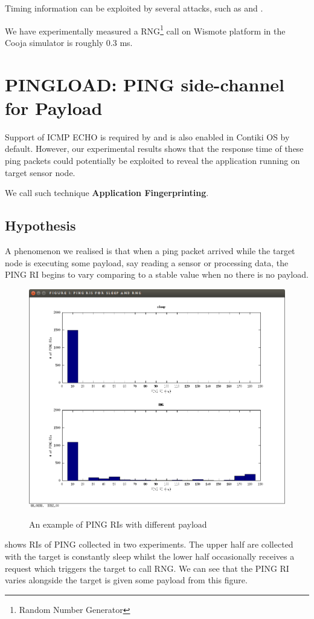 Timing information can be exploited by several attacks, such as \cite{Peekaboo} and \cite{rsatiming}.

We have experimentally measured a RNG\footnote{Random Number Generator} call on Wismote platform in the Cooja simulator is roughly 0.3 ms.

\section{PINGLOAD: PING side-channel for Payload }
Support of ICMP ECHO is required by \cite{rfc1122} and is also enabled in Contiki OS by default. However, our experimental results shows that the response time of these ping packets could potentially be exploited to reveal the application running on target sensor node.

We call such technique {\bf  Application Fingerprinting}.

\subsection{Hypothesis}
A phenomenon we realised is that when a ping packet arrived while the target node is executing some payload, say reading a sensor or processing data, the PING RI begins to vary comparing to a stable value  when no there is no payload. 

\begin{example}
\begin{figure}
\centering
{
  \includegraphics[width=1\textwidth]{fig/pingri.png}
}
\caption{An example of PING RIs with different payload}
\label{Fig: PINGLOAD RIs}
\end{figure}
 shows RIs of PING collected in two experiments. The upper half are collected with the target is constantly sleep whilst the lower half occasionally receives a request which triggers the target to call RNG. We can see that the PING RI varies alongside the target is given some payload from this figure.
\end{example}

